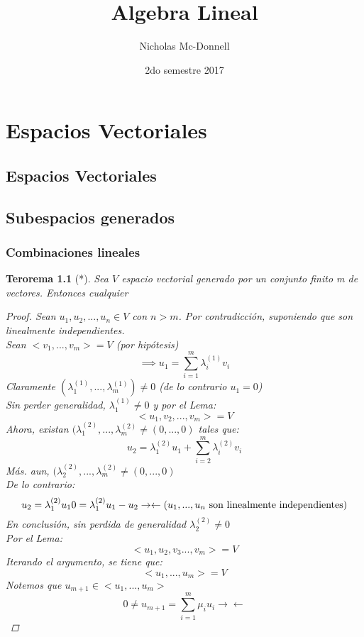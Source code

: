 \documentclass[11pt]{book}
\title{Algebra Lineal}
\author{Nicholas Mc-Donnell}
\date{2do semestre 2017}
\newtheorem{thm}{Terorema}[section]
\theoremstyle{definition}
\begin{document}
\maketitle
{}

\tableofcontents
{}
\chapter{Espacios Vectoriales}
\section{Espacios Vectoriales}
\section{Subespacios generados}
\subsection{Combinaciones lineales}
\begin{thm}[*]
	Sea $V$ espacio vectorial generado por un conjunto finito m de vectores. Entonces cualquier

	\begin{proof}
		Sean $u_1,u_2,...,u_n\in V$ con $n>m$. Por contradicción, suponiendo que son linealmente independientes.\\
		Sean $<v_1,...,v_m>=V$ (por hipótesis)
		\[
		\implies u_1=\sum^m_{i=1}\lambda_i^{(1)} v_i
		\]
		Claramente $(\lambda_1^{(1)},...,\lambda_m^{(1)})\neq 0$ (de lo contrario $u_1=0$)\\
		Sin perder generalidad, $\lambda_1^{(1)}\neq 0$ y por el Lema:
		\[
		<u_1,v_2,...,v_m>=V
		\]
		Ahora, existan $(\lambda_1^{(2)},...,\lambda_m^{(2)}\neq(0,...,0)$ tales que:
		\[
		u_2=\lambda_1^{(2)} u_1+\sum^m_{i=2}\lambda_i^{(2)}v_i
		\]
		Más. aun, $(\lambda_2^{(2)},...,\lambda_m^{(2)}\neq(0,...,0)$\\
		De lo contrario:
		\[
		u_2=\lambda_1^{(2)}u_1\\
		0=\lambda_1^{(2)}u_1-u_2\\
		\rightarrow\leftarrow (u_1,...,u_n\textrm{ son linealmente independientes})
		\]
		En conclusión, sin perdida de generalidad  $\lambda_2^{(2)}\neq 0$\\
		Por el Lema:
		\[
		<u_1,u_2,v_3...,v_m>=V
		\]
		Iterando el argumento, se tiene que:
		\[
		<u_1,...,u_m>=V
		\]
		Notemos que $u_{m+1}\in<u_1,...,u_m>$
		\[
		0\neq u_{m+1}=\sum^m_{i=1}\mu_i u_i
		\rightarrow\leftarrow
		\]		
	\end{proof}
\end{thm}
\end{document}
